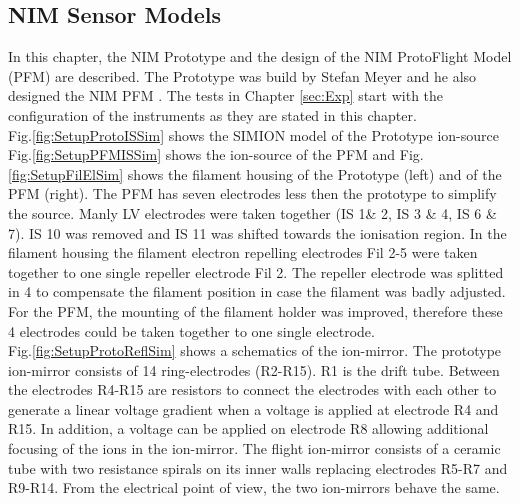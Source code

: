 	\subsection{NIM Sensor Models }\label{subsec:setupInst}
	In this chapter, the NIM Prototype and the design of the NIM ProtoFlight Model (PFM) are described. The Prototype was build by Stefan Meyer and he also designed the NIM PFM \cite{Diss_Meyer}. The tests in Chapter \ref{sec:Exp} start with the configuration of the instruments as they are stated in this chapter.\\
	Fig.\ref{fig:SetupProtoISSim} shows the SIMION model of the Prototype ion-source Fig.\ref{fig:SetupPFMISSim} shows the ion-source of the PFM and Fig.\ref{fig:SetupFilElSim} shows the filament housing of the Prototype (left) and of the PFM (right). The PFM has seven electrodes less then the prototype to simplify the source. Manly LV electrodes were taken together (IS 1\& 2, IS 3 \& 4, IS 6 \& 7). IS 10 was removed and IS 11 was shifted towards the ionisation region. In the filament housing the filament electron repelling electrodes Fil 2-5 were taken together to one single repeller electrode Fil 2. The repeller electrode was splitted in 4 to compensate the filament position in case the filament was badly adjusted. For the PFM, the mounting of the filament holder was improved, therefore these 4 electrodes could be taken together to one single electrode.\\
	Fig.\ref{fig:SetupProtoReflSim} shows a schematics of the ion-mirror. The prototype ion-mirror consists of 14 ring-electrodes (R2-R15). R1 is the drift tube. Between the electrodes R4-R15 are resistors to connect the electrodes with each other to generate a linear voltage gradient when a voltage is applied at electrode R4 and R15. In addition, a voltage can be applied on electrode R8 allowing additional focusing of the ions in the ion-mirror.	The flight ion-mirror consists of a ceramic tube with two resistance spirals on its inner walls replacing electrodes R5-R7 and R9-R14. From the electrical point of view, the two ion-mirrors behave the same.
	
	
	
